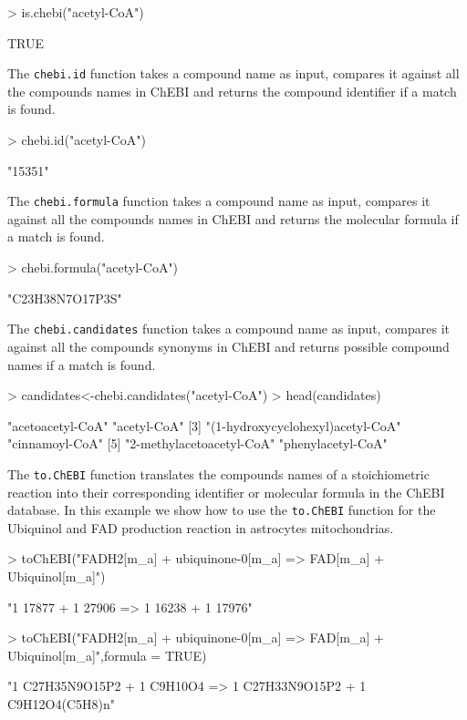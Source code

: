 \begin{Schunk}
\begin{Sinput}
> is.chebi("acetyl-CoA")
\end{Sinput}
\begin{Soutput}
[1] TRUE
\end{Soutput}
The \texttt{chebi.id} function takes a compound name as input, compares it against all the compounds names in ChEBI and returns the compound identifier if a match is found.
\begin{Sinput}
> chebi.id("acetyl-CoA")
\end{Sinput}
\begin{Soutput}
[1] "15351"
\end{Soutput}
The \texttt{chebi.formula} function takes a compound name as input, compares it against all the compounds names in ChEBI and returns the molecular formula if a match is found.
\begin{Sinput}
> chebi.formula("acetyl-CoA")
\end{Sinput}
\begin{Soutput}
[1] "C23H38N7O17P3S"
\end{Soutput}
The \texttt{chebi.candidates} function takes a compound name as input, compares it against all the compounds synonyms in ChEBI and returns possible compound names if a match is found.
\begin{Sinput}
> candidates<-chebi.candidates("acetyl-CoA")
> head(candidates)
\end{Sinput}
\begin{Soutput}
[1] "acetoacetyl-CoA"                 "acetyl-CoA"
[3] "(1-hydroxycyclohexyl)acetyl-CoA" "cinnamoyl-CoA"
[5] "2-methylacetoacetyl-CoA"         "phenylacetyl-CoA"
\end{Soutput}
The \texttt{to.ChEBI} function translates the compounds names of a stoichiometric reaction into their corresponding identifier or molecular formula in the ChEBI database. In this example we show how to use the \texttt{to.ChEBI} function for the Ubiquinol and FAD production reaction in astrocytes mitochondrias.
\begin{Sinput}
> toChEBI("FADH2[m_a] + ubiquinone-0[m_a] => FAD[m_a] + Ubiquinol[m_a]")
\end{Sinput}
\begin{Soutput}
[1] "1 17877 + 1 27906 => 1 16238 + 1 17976"
\end{Soutput}
\begin{Sinput}
> toChEBI("FADH2[m_a] + ubiquinone-0[m_a] => FAD[m_a] + Ubiquinol[m_a]",formula = TRUE)
\end{Sinput}
\begin{Soutput}
[1] "1 C27H35N9O15P2 + 1 C9H10O4 => 1 C27H33N9O15P2 + 1 C9H12O4(C5H8)n"
\end{Soutput}
\end{Schunk}
